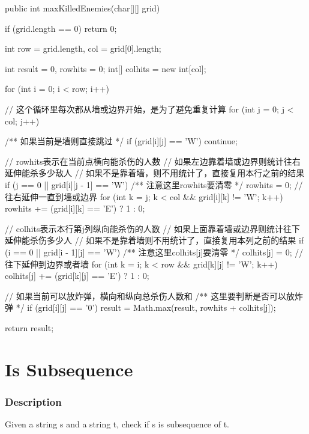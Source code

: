 \begin{Code}
public int maxKilledEnemies(char[][] grid) {
    if (grid.length == 0) {
        return 0;
    }

    int row = grid.length, col = grid[0].length;

    int result = 0, rowhits = 0;
    int[] colhits = new int[col];

    for (int i = 0; i < row; i++) {
        // 这个循环里每次都从墙或边界开始，是为了避免重复计算
        for (int j = 0; j < col; j++) {
            /** 如果当前是墙则直接跳过 */
            if (grid[i][j] == 'W') {
                continue;
            }

            // rowhits表示在当前点横向能杀伤的人数
            // 如果左边靠着墙或边界则统计往右延伸能杀多少敌人
            // 如果不是靠着墙，则不用统计了，直接复用本行之前的结果
            if (j == 0 || grid[i][j - 1] == 'W') {
                /** 注意这里rowhits要清零 */
                rowhits = 0;
                // 往右延伸一直到墙或边界
                for (int k = j; k < col && grid[i][k] != 'W'; k++) {
                    rowhits += (grid[i][k] == 'E') ? 1 : 0;
                }
            }

            // colhits表示本行第j列纵向能杀伤的人数
            // 如果上面靠着墙或边界则统计往下延伸能杀伤多少人
            // 如果不是靠着墙则不用统计了，直接复用本列之前的结果
            if (i == 0 || grid[i - 1][j] == 'W') {
                /** 注意这里colhits[j]要清零 */
                colhits[j] = 0;
                // 往下延伸到边界或者墙
                for (int k = i; k < row && grid[k][j] != 'W'; k++) {
                    colhits[j] += (grid[k][j] == 'E') ? 1 : 0;
                }
            }

            // 如果当前可以放炸弹，横向和纵向总杀伤人数和
            /** 这里要判断是否可以放炸弹 */
            if (grid[i][j] == '0') {
                result = Math.max(result, rowhits + colhits[j]);
            }
        }
    }

    return result;
}
\end{Code}

\newpage

\section{Is Subsequence} %

\subsubsection{Description}
Given a string s and a string t, check if s is subsequence of t.

